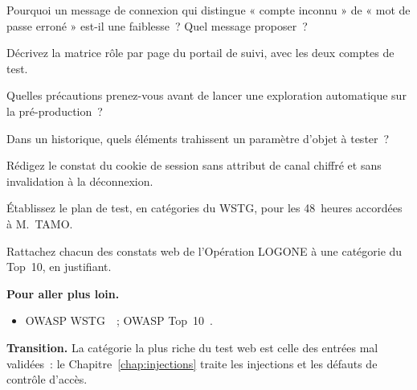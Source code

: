 \begin{boxexo}[title={\ding{45}\quad Exercice~14.4. Énumération \niveaumoyen}]
Pourquoi un message de connexion qui distingue « compte inconnu » de « mot
de passe erroné » est-il une faiblesse~? Quel message proposer~?
\end{boxexo}

\begin{boxexo}[title={\ding{45}\quad Exercice~14.5. Cartographie \niveaumoyen}]
Décrivez la matrice rôle par page du portail de suivi, avec les deux comptes
de test.
\end{boxexo}

\begin{boxexo}[title={\ding{45}\quad Exercice~14.6. Exploration prudente \niveaumoyen}]
Quelles précautions prenez-vous avant de lancer une exploration automatique
sur la pré-production~?
\end{boxexo}

\begin{boxexo}[title={\ding{45}\quad Exercice~14.7. Historique \niveaumoyen}]
Dans un historique, quels éléments trahissent un paramètre d'objet à
tester~?
\end{boxexo}

\begin{boxexo}[title={\ding{45}\quad Exercice~14.8. Session \niveaumoyen}]
Rédigez le constat du cookie de session sans attribut de canal chiffré et
sans invalidation à la déconnexion.
\end{boxexo}

\begin{boxexo}[title={\ding{45}\quad Exercice~14.9. Plan WSTG \niveauexpert}]
Établissez le plan de test, en catégories du WSTG, pour les 48~heures
accordées à M.~TAMO.
\end{boxexo}

\begin{boxexo}[title={\ding{45}\quad Exercice~14.10. Top 10 \niveauexpert}]
Rattachez chacun des constats web de l'Opération LOGONE à une catégorie du
Top~10, en justifiant.
\end{boxexo}

\bigskip

\begin{boxinfo}
\textbf{Pour aller plus loin.}
\begin{itemize}
    \item OWASP WSTG~\cite{owaspwstg}~; OWASP Top~10~\cite{owasptop10}.
\end{itemize}
\end{boxinfo}

\begin{boxinfo}
\textbf{Transition.} La catégorie la plus riche du test web est celle des
entrées mal validées~: le Chapitre~\ref{chap:injections} traite les
injections et les défauts de contrôle d'accès.
\end{boxinfo}
